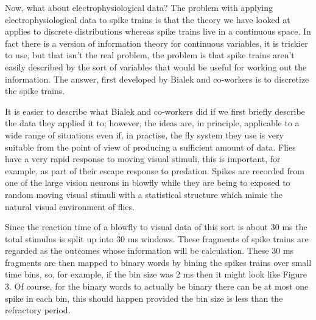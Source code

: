 \documentclass[11pt,a4paper]{scrartcl}
\begin{document}
Now, what about electrophysiological data? The problem with applying
electrophysiological data to spike trains is that the theory we have
looked at applies to discrete distributions whereas spike trains live
in a continuous space. In fact there is a version of information
theory for continuous variables, it is trickier to use, but that isn't
the real problem, the problem is that spike trains aren't easily
described by the sort of variables that would be useful for working
out the information. The answer, first developed by Bialek and co-workers is
to discretize the spike trains. 

It is easier to describe what Bialek and co-workers did if we first
briefly describe the data they applied it to; however, the ideas are,
in principle, applicable to a wide range of situations even if, in
practise, the fly system they use is very suitable from the point of
view of producing a sufficient amount of data. Flies have a very rapid
response to moving visual stimuli, this is important, for example, as
part of their escape response to predation. Spikes are recorded from
one of the large vision neurons in blowfly while they are being to
exposed to random moving visual stimuli with a statistical structure
which mimic the natural visual environment of flies.

Since the reaction time of a blowfly to visual data of this sort is
about 30 ms the total stimulus is split up into 30 ms windows. These
fragments of spike trains are regarded as the outcomes whose
information will be calculation. These 30 ms fragments are then mapped
to binary words by bining the spikes trains over small time bins, so,
for example, if the bin size was 2 ms then it might look like Figure
3. Of course, for the binary words to actually be binary there can be
at most one spike in each bin, this should happen provided the bin
size is less than the refractory period.

\begin{figure}
\begin{center}

\end{center}
\end{figure}
\end{document}
